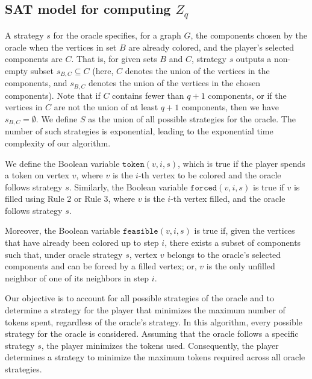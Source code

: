 \documentclass[11pt]{article}
\theoremstyle{plain}
\theoremstyle{definition}
\theoremstyle{remark}
\begin{document}
\subsection{SAT model for computing \texorpdfstring{\(Z_q\)}{Zq}}\label{sec:SAT}

A strategy $ s $ for the oracle specifies, for a graph $ G $, the components chosen by the oracle when the vertices in set $ B $ are already colored, and the player’s selected components are $ C $. That is, for given sets $ B $ and $ C $, strategy $ s $ outputs a non-empty subset $ s_{B,C} \subseteq C $ (here, $C$ denotes the union of the vertices in the components, and $s_{B,C}$ denotes the union of the vertices in the chosen components). Note that if $C$ contains fewer than $q+1$ components, or if the vertices in $C$ are not the union of at least $q+1$ components, then we have $s_{B,C} = \emptyset$. We define $ S $ as the union of all possible strategies for the oracle. The number of such strategies is exponential, leading to the exponential time complexity of our algorithm. 

We define the Boolean variable $ \texttt{token}(v, i, s) $, which is true if the player spends a token on vertex $ v $, where $ v $ is the $ i $-th vertex to be colored and the oracle follows strategy $ s $. Similarly, the Boolean variable $ \texttt{forced}(v, i, s) $ is true if $ v $ is filled using Rule 2 or Rule 3, where $ v $ is the $ i $-th vertex filled, and the oracle follows strategy $ s $.

Moreover, the Boolean variable $ \texttt{feasible}(v, i, s) $ is true if, given the vertices that have already been colored up to step $ i $, there exists a subset of components such that, under oracle strategy $ s $, vertex $ v $ belongs to the oracle’s selected components and can be forced by a filled vertex; or, $v$ is the only unfilled neighbor of one of its neighbors in step $i$.

Our objective is to account for all possible strategies of the oracle and to determine a strategy for the player that minimizes the maximum number of tokens spent, regardless of the oracle's strategy. In this algorithm, every possible strategy for the oracle is considered. Assuming that the oracle follows a specific strategy $ s $, the player minimizes the tokens used. Consequently, the player determines a strategy to minimize the maximum tokens required across all oracle strategies.
 
\end{document}

